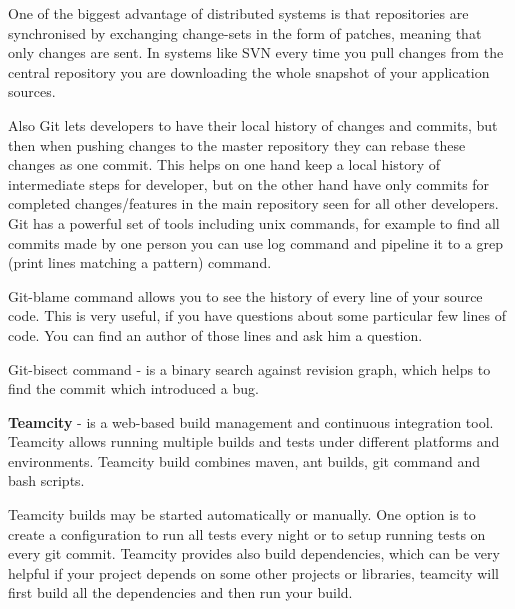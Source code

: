   One of the biggest advantage of distributed systems is that repositories are
  synchronised by exchanging change-sets in the form of patches, meaning that 
  only changes are sent. In systems like SVN every time you pull changes from
  the central repository you are downloading the whole snapshot of your application sources.
  
  Also Git lets developers to have their local history of changes and commits,
  but then when pushing changes to the master repository they can rebase these changes as one commit.
  This helps on one hand keep a local history of intermediate steps for
  developer, but on the other hand have only commits for completed changes/features in the main repository
  seen for all other developers. Git has a powerful set of tools including unix commands,
  for example to find all commits made by one person you can use log command and pipeline it to a grep 
  (print lines matching a pattern) command.
  
   Git-blame command allows you to see the history of every line of your source
   code. This is very useful, if you have questions about some particular few lines of code.
   You can find an author of those lines and ask him a question.
   
   Git-bisect command - is a binary search against revision graph, which helps to find the commit which
   introduced a bug.

  \textbf{Teamcity} - is a web-based build management and continuous integration
  tool. Teamcity allows running multiple builds and tests under different platforms and environments.
  Teamcity build combines maven, ant builds, git command and bash scripts.
  
  Teamcity builds may be started automatically or manually. One option is to create a configuration to run all
  tests every night or to setup running tests on every git commit. Teamcity
  provides also build dependencies, which can be very helpful if your project
  depends on some other projects or libraries, teamcity will first build all the dependencies and then run your build.
  
